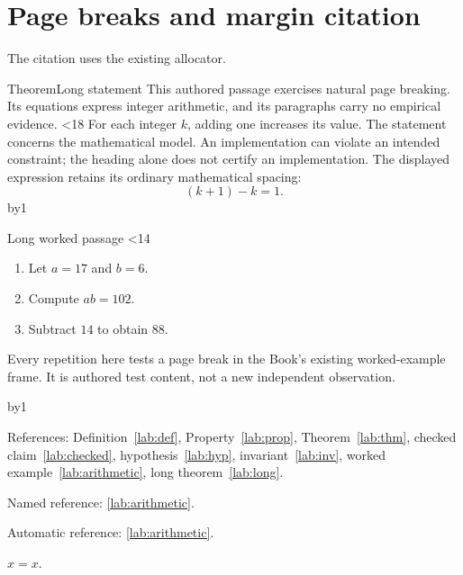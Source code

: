 \documentclass[11pt,twoside]{article}
\begin{document}
\section{Page breaks and margin citation}
The citation uses the existing allocator.
\par
\makeatletter
{}%
\pd@placemarginopt{\pd@sidebox}
\makeatother
\begin{pdclaim}{Theorem}{Long statement}\label{lab:long}
This authored passage exercises natural page breaking. Its equations express
integer arithmetic, and its paragraphs carry no empirical evidence.
\newcount\labloop{}
\loop\ifnum\labloop<18
For each integer $k$, adding one increases its value. The statement concerns
the mathematical model. An implementation can violate an intended constraint;
the heading alone does not certify an implementation. The displayed expression
retains its ordinary mathematical spacing:
\[ (k+1)-k=1. \]
\advance\labloop by1\repeat
\end{pdclaim}
\begin{pdexample}{Long worked passage}\label{lab:longexample}
\loop\ifnum\labloop<14
\begin{enumerate}\item Let $a=17$ and $b=6$.\item Compute $ab=102$.
\item Subtract $14$ to obtain $88$.\end{enumerate}
Every repetition here tests a page break in the Book's existing worked-example
frame. It is authored test content, not a new independent observation.\par
\advance\labloop by1\repeat
\end{pdexample}
{\raggedright References: Definition~\ref{lab:def}, Property~\ref{lab:prop},
Theorem~\ref{lab:thm}, checked claim~\ref{lab:checked}, hypothesis~\ref{lab:hyp},
invariant~\ref{lab:inv}, worked example~\ref{lab:arithmetic},
long theorem~\ref{lab:long}.\par}
Named reference: \cref{lab:arithmetic}.\par
Automatic reference: \autoref{lab:arithmetic}.\par
\begin{lemma}[Identity]$x=x$.\end{lemma}
\end{document}
